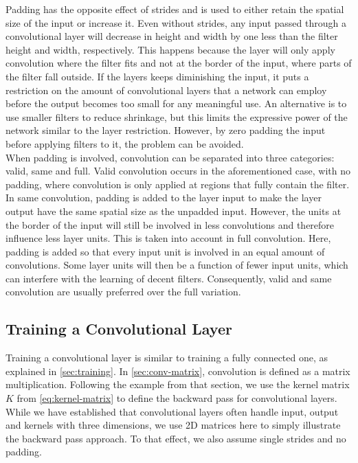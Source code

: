 Padding has the opposite effect of strides and is used to either retain the spatial size of the input or increase it. Even without strides, any input passed through a convolutional layer will decrease in height and width by one less than the filter height and width, respectively. This happens because the layer will only apply convolution where the filter fits and not at the border of the input, where parts of the filter fall outside. If the layers keeps diminishing the input, it puts a restriction on the amount of convolutional layers that a network can employ before the output becomes too small for any meaningful use. An alternative is to use smaller filters to reduce shrinkage, but this limits the expressive power of the network similar to the layer restriction. However, by zero padding the input before applying filters to it, the problem can be avoided. \\

\noindent When padding is involved, convolution can be separated into three categories: valid, same and full. Valid convolution occurs in the aforementioned case, with no padding, where convolution is only applied at regions that fully contain the filter. In same convolution, padding is added to the layer input to make the layer output have the same spatial size as the unpadded input. However, the units at the border of the input will still be involved in less convolutions and therefore influence less layer units. This is taken into account in full convolution. Here, padding is added so that every input unit is involved in an equal amount of convolutions. Some layer units will then be a function of fewer input units, which can interfere with the learning of decent filters. Consequently, valid and same convolution are usually preferred over the full variation.

\subsection{Training a Convolutional Layer}

Training a convolutional layer is similar to training a fully connected one, as explained in \autoref{sec:training}. In \autoref{sec:conv-matrix}, convolution is defined as a matrix multiplication. Following the example from that section, we use the kernel matrix $K$ from \autoref{eq:kernel-matrix} to define the backward pass for convolutional layers. While we have established that convolutional layers often handle input, output and kernels with three dimensions, we use 2D matrices here to simply illustrate the backward pass approach. To that effect, we also assume single strides and no padding. 

